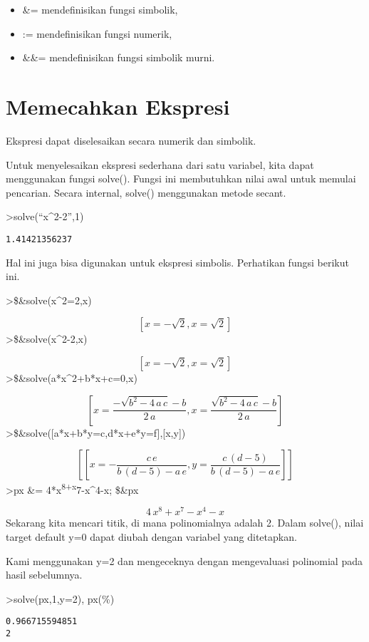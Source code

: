 \documentclass[
]{book}
\begin{document}
\begin{itemize}
\item
  \&= mendefinisikan fungsi simbolik,
\item
  := mendefinisikan fungsi numerik,
\item
  \&\&= mendefinisikan fungsi simbolik murni.
\end{itemize}

\chapter{Memecahkan Ekspresi}\label{memecahkan-ekspresi}

Ekspresi dapat diselesaikan secara numerik dan simbolik.

Untuk menyelesaikan ekspresi sederhana dari satu variabel, kita dapat menggunakan fungsi solve(). Fungsi ini membutuhkan nilai awal untuk memulai pencarian. Secara internal, solve() menggunakan metode secant.

\textgreater solve(``x\^{}2-2'',1)

\begin{verbatim}
1.41421356237
\end{verbatim}

Hal ini juga bisa digunakan untuk ekspresi simbolis. Perhatikan fungsi berikut ini.

\textgreater\$\&solve(x\^{}2=2,x)

\[\left[ x=-\sqrt{2} , x=\sqrt{2} \right] \]\textgreater\$\&solve(x\^{}2-2,x)

\[\left[ x=-\sqrt{2} , x=\sqrt{2} \right] \]\textgreater\$\&solve(a*x\^{}2+b*x+c=0,x)

\[\left[ x=\frac{-\sqrt{b^2-4\,a\,c}-b}{2\,a} , x=\frac{\sqrt{b^2-4\,
 a\,c}-b}{2\,a} \right] \]\textgreater\$\&solve({[}a*x+b*y=c,d*x+e*y=f{]},{[}x,y{]})

\[\left[ \left[ x=-\frac{c\,e}{b\,\left(d-5\right)-a\,e} , y=\frac{c
 \,\left(d-5\right)}{b\,\left(d-5\right)-a\,e} \right]  \right] \]\textgreater px \&= 4*x\textsuperscript{8+x}7-x\^{}4-x; \$\&px

\[4\,x^8+x^7-x^4-x\]Sekarang kita mencari titik, di mana polinomialnya adalah 2. Dalam solve(), nilai target default y=0 dapat diubah dengan variabel yang ditetapkan.

Kami menggunakan y=2 dan mengeceknya dengan mengevaluasi polinomial pada hasil sebelumnya.

\textgreater solve(px,1,y=2), px(\%)

\begin{verbatim}
0.966715594851
2
\end{verbatim}
\end{document}
